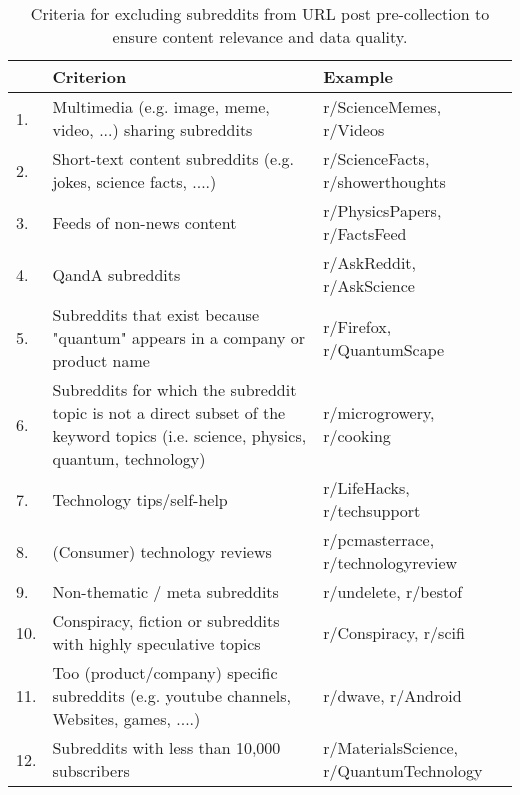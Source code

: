 

\begin{table}[ht]
\centering
\begin{tabular}{lp{7cm}@{\hspace{10pt}} p{6cm}}
\toprule
 & \textbf{Criterion} & \textbf{Example} \\
\midrule
1. & Multimedia (e.g. image, meme, video, ...) sharing subreddits & r/ScienceMemes, r/Videos \\
\midrule
2. & Short-text content subreddits (e.g. jokes, science facts, ....)  &  r/ScienceFacts,  r/showerthoughts \\
\midrule
3. & Feeds of non-news content & r/PhysicsPapers, r/FactsFeed \\
\midrule
4. & QandA subreddits & r/AskReddit, r/AskScience \\
\midrule
5. & Subreddits that exist because "quantum" appears in a company or product name &  r/Firefox, r/QuantumScape \\
\midrule
6. & Subreddits for which the subreddit topic is not a direct subset of the keyword topics (i.e. science, physics, quantum, technology)  & r/microgrowery, r/cooking \\
\midrule
7. & Technology tips/self-help  & r/LifeHacks, r/techsupport \\
\midrule
8. & (Consumer) technology reviews & r/pcmasterrace, r/technologyreview \\
\midrule
9. & Non-thematic / meta subreddits & r/undelete, r/bestof \\
\midrule
10. & Conspiracy, fiction or subreddits with highly speculative topics & r/Conspiracy, r/scifi  \\
\midrule
11. & Too (product/company) specific subreddits (e.g. youtube channels, Websites, games, ....) & r/dwave, r/Android \\
\midrule
12. & Subreddits with less than 10,000 subscribers & r/MaterialsScience, r/QuantumTechnology \\
\bottomrule
\end{tabular}
\vspace{5pt}
\caption{Criteria for excluding subreddits from URL post pre-collection to ensure content relevance and data quality.}
\label{tab:exclcrit_subreddits}
\end{table}

